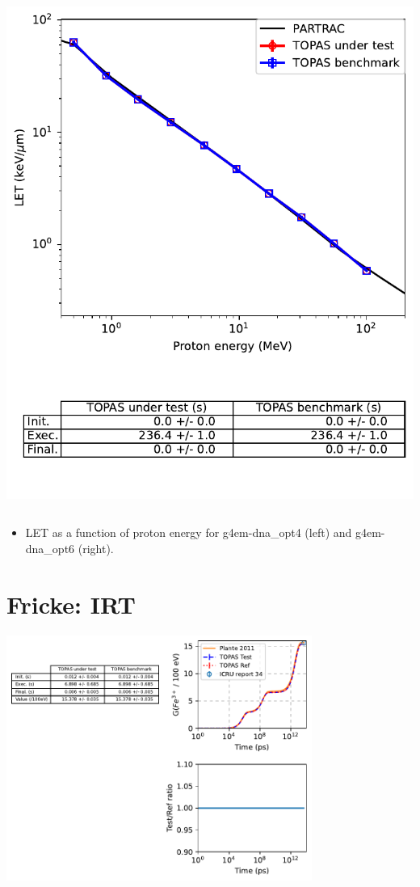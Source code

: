 \documentclass[aspectratio=1610]{beamer}
\begin{document}
\begin{frame}{\secname}
\begin{columns}
\begin{column}{0.4\linewidth}
     \includegraphics[width=\textwidth]{./LET/LET_g4em-dna_opt6}
    \end{column}
   \end{columns}
\begin{itemize}
\item \tiny{LET as a function of proton energy for g4em-dna\_opt4 (left) and g4em-dna\_opt6 (right).}
\end{itemize}
\end{frame}

\section{Fricke: IRT}

\begin{frame}{\secname}
 \centering
  \includegraphics[width=0.75\textwidth]{./FrickeIRT/Gvalue}
\end{frame}
\end{document}
